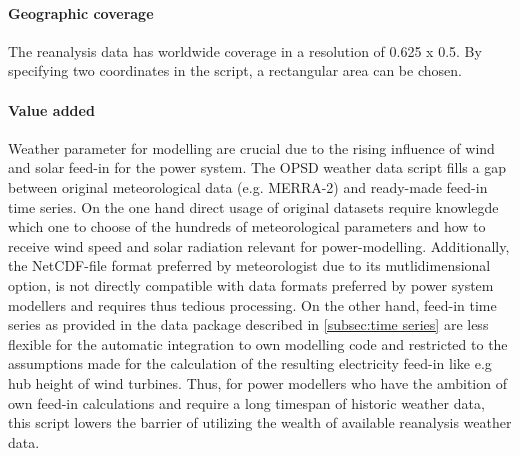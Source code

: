 \documentclass[article]{elsarticle}
\begin{document}
\paragraph{Geographic coverage}
The reanalysis data has worldwide coverage in a resolution of 0.625 x 0.5. By specifying two coordinates in the script, a rectangular area can be chosen.

\paragraph{Value added}
Weather parameter for modelling are crucial due to the rising influence of wind and solar feed-in for the power system. The OPSD weather data script fills a gap between original meteorological data (e.g. MERRA-2) and ready-made feed-in time series. On the one hand direct usage of original datasets require knowlegde which one to choose of the hundreds of meteorological parameters and how to receive wind speed and solar radiation relevant for power-modelling. Additionally, the NetCDF-file format preferred by meteorologist due to its mutlidimensional option, is not directly compatible with data formats preferred by power system modellers and requires thus tedious processing. On the other hand, feed-in time series as provided in the data package described in \ref{subsec:time series} are less flexible for the automatic integration to own modelling code and restricted to the assumptions made for the calculation of the resulting electricity feed-in like e.g hub height of wind turbines. Thus, for power modellers who have the ambition of own feed-in calculations and require a long timespan of historic weather data, this script lowers the barrier of utilizing the wealth of available reanalysis weather data.
        
\end{document}
